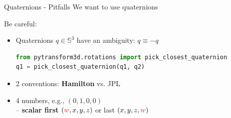 \documentclass[14pt,aspectratio=169]{beamer}
\begin{document}
\begin{frame}[fragile]{Quaternions - Pitfalls}
We want to use quaternions \parencite{Ude2014}

\vskip 1cm
\pause

Be careful:
\begin{itemize}
\item Quaternions $q \in \mathbb{S}^3$ have an ambiguity: $q \equiv -q$
\begin{lstlisting}[language=Python]
from pytransform3d.rotations import pick_closest_quaternion
q1 = pick_closest_quaternion(q1, q2)
\end{lstlisting}
\item 2 conventions: \textbf{Hamilton} vs. JPL\\\parencite{Sommer2018}
\item 4 numbers, e.g., $(0, 1, 0, 0)$\\
-- \textbf{scalar first} $(\textcolor{red}{w}, x, y, z)$ or last
$(x, y, z, \textcolor{red}{w})$
\end{itemize}
\end{frame}
\end{document}

